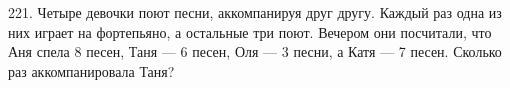 221. Четыре девочки поют песни, аккомпанируя друг другу. Каждый раз одна из них играет на фортепьяно, а остальные три поют. Вечером они посчитали, что Аня
спела 8 песен, Таня --- 6 песен, Оля --- 3 песни, а Катя --- 7 песен. Сколько раз аккомпанировала Таня?\\
